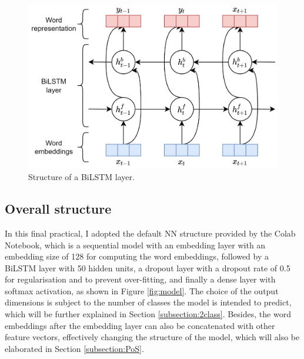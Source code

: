 \documentclass[11pt,a4paper]{article}
\begin{document}
\begin{figure}
    \centering
    \includegraphics[width=\columnwidth]{figs/BiLSTM.png}
    \caption{Structure of a BiLSTM layer.}
    \label{fig:BiLSTM}
\end{figure}

\subsection{Overall structure}

In this final practical, I adopted the default NN structure provided by the Colab Notebook, which is a sequential model with an embedding layer with an embedding size of 128 for computing the word embeddings, followed by a BiLSTM layer with 50 hidden units, a dropout layer with a dropout rate of 0.5 for regularisation and to prevent over-fitting, and finally a dense layer with softmax activation, as shown in Figure \ref{fig:model}. The choice of the output dimensions is subject to the number of classes the model is intended to predict, which will be further explained in Section \ref{subsection:2class}. Besides, the word embeddings after the embedding layer can also be concatenated with other feature vectors, effectively changing the structure of the model, which will also be elaborated in Section \ref{subsection:PoS}.
\end{document}
